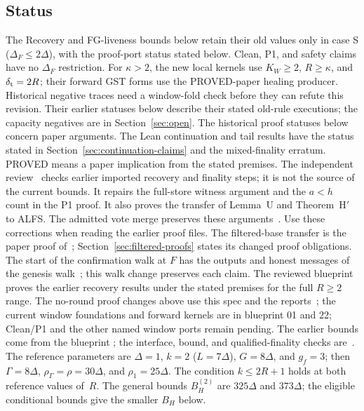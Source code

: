 \documentclass{article}
\theoremstyle{plain}
\theoremstyle{definition}
\theoremstyle{remark}
\begin{document}
\subsection{Status}\label{sec:status}

The Recovery and FG-liveness bounds below retain their old values only
in case S ($\Delta_F\leq2\Delta$), with the proof-port status stated below.
Clean, P1, and safety claims have no $\Delta_F$ restriction.
For $\kappa>2$, the new local kernels use $K_W\geq2$, $R\geq\kappa$,
and $\delta_{\rm t}=2R$; their forward GST forms use the PROVED-paper healing producer.
Historical negative traces need a window-fold check before they can
refute this revision.  Their earlier statuses below describe their
stated old-rule executions; the capacity negatives are in Section~\ref{sec:open}.
The historical proof statuses below concern paper arguments.  The Lean
continuation and tail results have the status stated in
Section~\ref{sec:continuation-claims} and the mixed-finality erratum.  PROVED
means a paper implication from the stated premises.  The independent
review~\cite[\S\S4--7]{ALFS} checks earlier imported recovery and
finality steps; it is not the source of the current bounds.  It repairs the full-store witness argument and the $a<h$
count in the P1 proof.  It also proves the transfer of Lemma~U and
Theorem~H$'$ to ALFS.  The admitted vote merge preserves these
arguments~\cite[\S1]{FIX}.  Use these corrections when reading the
earlier proof files.  The filtered-base transfer is the paper proof
of~\cite[\S\S3--7]{FB}; Section~\ref{sec:filtered-proofs} states its
changed proof obligations.
The start of the confirmation walk at $F$ has the outputs and honest
messages of the genesis walk~\cite{GF208}; this walk change preserves each claim.
The reviewed blueprint~\cite{BPO,BPH,BPF} proves the earlier recovery results
under the stated premises for the full $R\geq2$ range.  The no-round
proof changes above use this spec and the reports~\cite{NRB,NRBC,NRS3A,NRS3O};
the current window foundations and forward kernels are in blueprint 01 and 22;
Clean/P1 and the other named window ports remain pending.  The earlier bounds come from the blueprint
\cite{BPH,BPF}; the interface, bound, and qualified-finality checks
are~\cite{BPR,BPHR,THR,BBR,QFR}.  The reference parameters are $\Delta=1$,
$k=2$ ($L=7\Delta$), $G=8\Delta$, and $g_f=3$; then
$\Gamma=8\Delta$, $\rho_\Gamma=\rho=30\Delta$, and $\rho_1=25\Delta$.
The condition $k\leq2R+1$ holds at both reference values of~$R$.
The general bounds $B_H^{(2)}$ are $325\Delta$ and $373\Delta$;
the eligible conditional bounds give the smaller $B_H$ below.
\end{document}
